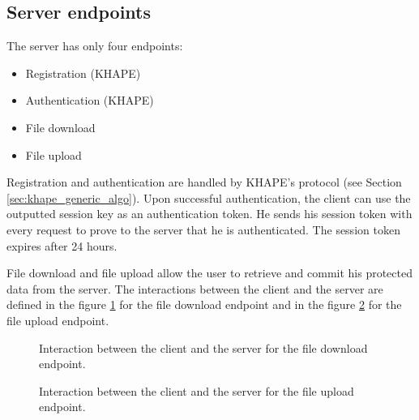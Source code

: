 \documentclass[../report.tex]{subfiles}
\begin{document}
\subsection{Server endpoints}
The server has only four endpoints:
\begin{itemize}
 \item Registration (KHAPE)
 \item Authentication (KHAPE)
 \item File download
 \item File upload
\end{itemize}
Registration and authentication are handled by KHAPE's protocol (see Section \ref{sec:khape_generic_algo}). Upon successful authentication, the client can use the outputted session key as an authentication token. He sends his session token with every request to prove to the server that he is authenticated. The session token expires after 24 hours.

File download and file upload allow the user to retrieve and commit his protected data from the server. The interactions between the client and the server are defined in the figure \ref{fig:usecase_download} for the file download endpoint and in the figure \ref{fig:usecase_upload} for the file upload endpoint.


\begin{figure}[h]
 \centering
 \setlength{\fboxsep}{10pt}
 \setlength{\fboxrule}{1pt}
 \caption{Interaction between the client and the server for the file download endpoint.}
 \label{fig:usecase_download}
\end{figure}

\begin{figure}[h]
 \centering
 \setlength{\fboxsep}{10pt}
 \setlength{\fboxrule}{1pt}
 \caption{Interaction between the client and the server for the file upload endpoint.}
 \label{fig:usecase_upload}
\end{figure}
\end{document}
